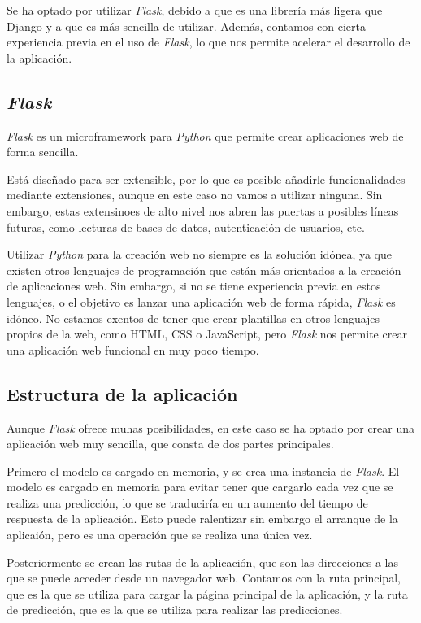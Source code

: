 Se ha optado por utilizar \textit{Flask}, debido a que es una librería más ligera que Django y a que es más sencilla de utilizar.
Además, contamos con cierta experiencia previa en el uso de \textit{Flask}, lo que nos permite acelerar el desarrollo de la aplicación.


\subsection{\textit{Flask}}
\textit{Flask} es un microframework para \textit{Python} que permite crear aplicaciones web de forma sencilla.

Está diseñado para ser extensible, por lo que es posible añadirle funcionalidades mediante extensiones, aunque en este caso no vamos a utilizar ninguna.
Sin embargo, estas extensinoes de alto nivel nos abren las puertas a posibles líneas futuras, como lecturas de bases de datos, autenticación de usuarios, etc.

Utilizar \textit{Python} para la creación web no siempre es la solución idónea, ya que existen otros lenguajes de programación que están más orientados a la creación de aplicaciones web.
Sin embargo, si no se tiene experiencia previa en estos lenguajes, o el objetivo es lanzar una aplicación web de forma rápida, \textit{Flask} es idóneo.
No estamos exentos de tener que crear plantillas en otros lenguajes propios de la web, como HTML, CSS o JavaScript, pero \textit{Flask} nos permite crear una aplicación web funcional en muy poco tiempo.


\subsection{Estructura de la aplicación}
Aunque \textit{Flask} ofrece muhas posibilidades, en este caso se ha optado por crear una aplicación web muy sencilla, que consta de dos partes principales.

Primero el modelo es cargado en memoria, y se crea una instancia de \textit{Flask}.
El modelo es cargado en memoria para evitar tener que cargarlo cada vez que se realiza una predicción, lo que se traduciría en un aumento del tiempo de respuesta de la aplicación.
Esto puede ralentizar sin embargo el arranque de la aplicaión, pero es una operación que se realiza una única vez.

Posteriormente se crean las rutas de la aplicación, que son las direcciones a las que se puede acceder desde un navegador web.
Contamos con la ruta principal, que es la que se utiliza para cargar la página principal de la aplicación, y la ruta de predicción, que es la que se utiliza para realizar las predicciones.

